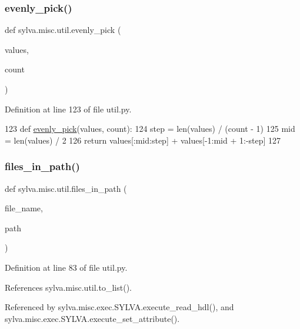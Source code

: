 \subsubsection{\texorpdfstring{evenly\+\_\+pick()}{evenly\_pick()}}
{\footnotesize\ttfamily def sylva.\+misc.\+util.\+evenly\+\_\+pick (\begin{DoxyParamCaption}\item[{}]{values,  }\item[{}]{count }\end{DoxyParamCaption})}



Definition at line 123 of file util.\+py.


\begin{DoxyCode}
123 \textcolor{keyword}{def }\hyperlink{namespacesylva_1_1misc_1_1util_a0881116abd7a50c6cd552b6b3edafea3}{evenly\_pick}(values, count):
124     step = len(values) / (count - 1)
125     mid = len(values) / 2
126     \textcolor{keywordflow}{return} values[:mid:step] + values[-1:mid + 1:-step]
127 
\end{DoxyCode}
\mbox{\label{namespacesylva_1_1misc_1_1util_a7ad460a52be16d3083cb41f0be004714}} 
\subsubsection{\texorpdfstring{files\+\_\+in\+\_\+path()}{files\_in\_path()}}
{\footnotesize\ttfamily def sylva.\+misc.\+util.\+files\+\_\+in\+\_\+path (\begin{DoxyParamCaption}\item[{}]{file\+\_\+name,  }\item[{}]{path }\end{DoxyParamCaption})}



Definition at line 83 of file util.\+py.



References sylva.\+misc.\+util.\+to\+\_\+list().



Referenced by sylva.\+misc.\+exec.\+S\+Y\+L\+V\+A.\+execute\+\_\+read\+\_\+hdl(), and sylva.\+misc.\+exec.\+S\+Y\+L\+V\+A.\+execute\+\_\+set\+\_\+attribute().



